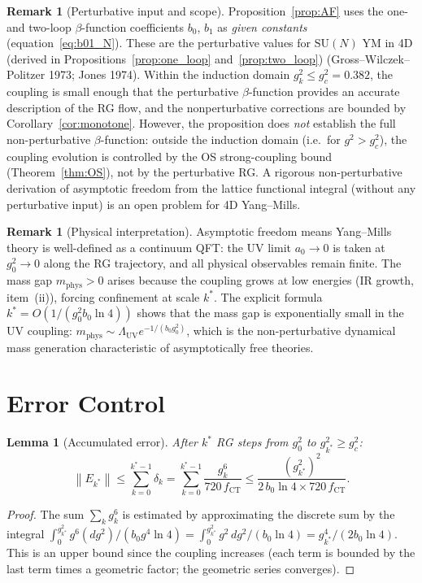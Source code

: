 \documentclass[11pt,a4paper]{amsart}
\newtheorem{lemma}[theorem]{Lemma}
\theoremstyle{definition}
\newtheorem{remark}[theorem]{Remark}
\newcommand{\SU}{\mathrm{SU}}
\newcommand{\norm}[1]{\left\|#1\right\|}
\newcommand{\gB}{g^2_c}
\begin{document}
\begin{remark}[Perturbative input and scope]
\label{rem:AF_scope}
Proposition~\ref{prop:AF} uses the one- and two-loop $\beta$-function
coefficients $b_0$, $b_1$ as \emph{given constants} (equation~\eqref{eq:b01_N}).
These are the perturbative values for $\SU(N)$ YM in 4D
(derived in Propositions~\ref{prop:one_loop} and~\ref{prop:two_loop})
(Gross--Wilczek--Politzer 1973; Jones 1974).  Within the induction domain
$g^2_k \le g^2_c = 0.382$, the coupling is small enough that the perturbative
$\beta$-function provides an accurate description of the RG flow, and the
nonperturbative corrections are bounded by Corollary~\ref{cor:monotone}.
However, the proposition does \emph{not} establish the full non-perturbative
$\beta$-function: outside the induction domain (i.e.\ for $g^2 > g^2_c$),
the coupling evolution is controlled by the OS strong-coupling bound
(Theorem~\ref{thm:OS}), not by the perturbative RG.  A rigorous non-perturbative
derivation of asymptotic freedom from the lattice functional integral (without
any perturbative input) is an open problem for 4D Yang--Mills.
\end{remark}

\begin{remark}[Physical interpretation]
\label{rem:AF_phys}
Asymptotic freedom means Yang--Mills theory is well-defined as a continuum QFT:
the UV limit $a_0 \to 0$ is taken at $g^2_0 \to 0$ along the RG trajectory, and
all physical observables remain finite.  The mass gap $m_{\mathrm{phys}} > 0$
arises because the coupling grows at low energies (IR growth, item~(ii)), forcing
confinement at scale $k^*$.  The explicit formula $k^* = O(1/(g^2_0 b_0\ln 4))$
shows that the mass gap is exponentially small in the UV coupling:
$m_{\mathrm{phys}} \sim \Lambda_{\mathrm{UV}} e^{-1/(b_0 g^2_0)}$,
which is the non-perturbative dynamical mass generation characteristic of
asymptotically free theories.
\end{remark}

\section{Error Control}
\label{sec:error}

\begin{lemma}[Accumulated error]
\label{lem:error}
After $k^*$ RG steps from $g^2_0$ to $g^2_{k^*}\ge\gB$:
\[
  \norm{E_{k^*}} \le \sum_{k=0}^{k^*-1} \delta_k
  = \sum_{k=0}^{k^*-1} \frac{g^6_k}{720\,f_{\mathrm{CT}}}
  \le \frac{(g^2_{k^*})^2}{2\,b_0\ln 4\times 720\,f_{\mathrm{CT}}}.
\]
\end{lemma}
\begin{proof}
The sum $\sum_k g^6_k$ is estimated by approximating the discrete sum
by the integral $\int_0^{g^2_{k^*}} g^6 (dg^2)/(b_0 g^4\ln 4)
= \int_0^{g^2_{k^*}} g^2\,dg^2/(b_0\ln 4)
= g^4_{k^*}/(2b_0\ln 4)$.
This is an upper bound since the coupling increases (each term is bounded
by the last term times a geometric factor; the geometric series converges).
\end{proof}
\end{document}
